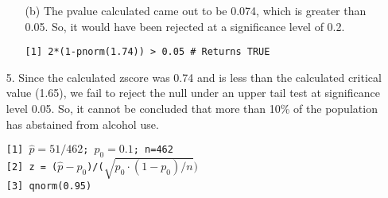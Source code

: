 \documentclass[12pt]{article}
\begin{document}
\begin{enumerate}
\begin{enumerate}
			\item[(b)] The pvalue calculated came out to be 0.074, which is greater than 0.05. So, 
				it would have been rejected at a significance level of 0.2.
		\begin{tcolorbox}[colback=white, title=Work, coltitle=white]
			\texttt{[1] 2*(1-pnorm(1.74)) > 0.05 \# Returns TRUE}\\
		\end{tcolorbox}
		\end{enumerate}
	\item[5.] Since the calculated zscore was 0.74 and is less than the calculated critical value (1.65), we fail to reject the null under an upper 
		tail test at significance level 0.05. So, it cannot be concluded that more than 10\% of the population has abstained from alcohol use.

		\begin{tcolorbox}[colback=white, title=Work, coltitle=white]
					 \texttt{[1] $\hat{p} = 51/462$; $p_0 = 0.1$; n=462}\\
					 \texttt{[2] z = ($\hat{p} -p_0$)/($\sqrt{p_0\cdot(1-p_0)/n})$}\\
					 \texttt{[3] qnorm(0.95)}
				 \end{tcolorbox}
\end{enumerate}
\end{document}
